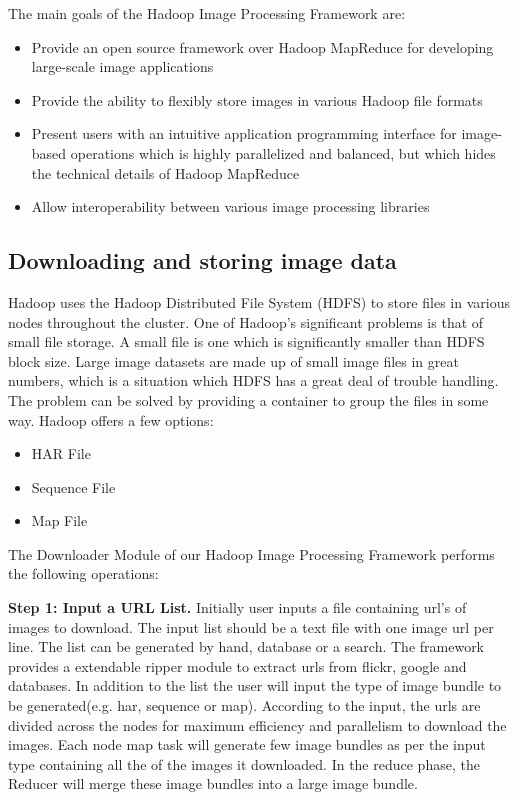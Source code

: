 \documentclass[conference]{IEEEtran}
\begin{document}
The main goals of the Hadoop Image Processing Framework are:
\begin{itemize}
\item Provide an open source framework over Hadoop MapReduce for
  developing large-scale image applications
\item Provide the ability to flexibly store images in various Hadoop
  file formats
\item Present users with an intuitive application programming
  interface for image-based operations which is highly parallelized
  and balanced, but which hides the technical details of Hadoop
  MapReduce
\item Allow interoperability between various image processing
  libraries
\end{itemize}

\subsection{Downloading and storing image data}
Hadoop uses the Hadoop Distributed File System (HDFS) to store files
in various nodes throughout the cluster.  One of Hadoop's significant
problems is that of small file storage. \cite{White2009} A small file
is one which is significantly smaller than HDFS block size.  Large
image datasets are made up of small image files in great numbers,
which is a situation which HDFS has a great deal of trouble
handling. The problem can be solved by providing a container to group
the files in some way. Hadoop offers a few options:
\begin{itemize}
	\item HAR File
	\item Sequence File
	\item Map File
\end{itemize}

The Downloader Module of our Hadoop Image Processing Framework
performs the following operations:

\textbf{Step 1: Input a URL List.} Initially user inputs a file containing url's of images to download. The input list should be a text file with one image url per line. The list can be generated by hand, database or a search. The framework provides a extendable ripper module to extract urls from flickr, google and databases. In addition to the list the user will input the type of image bundle to be generated(e.g. har, sequence or map). According to the input, the urls are divided across the nodes for maximum efficiency and parallelism to download the images. Each node map task will generate few image bundles as per the input type containing all the of the images it downloaded. In the reduce phase, the Reducer will merge these image bundles  into a large image bundle.
\end{document}
